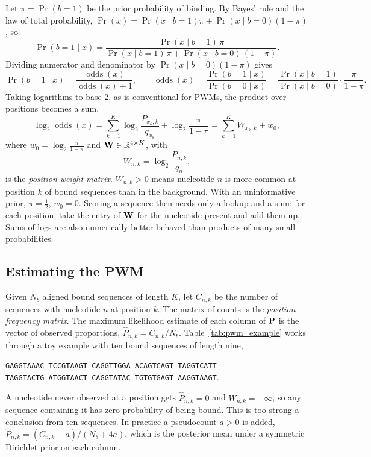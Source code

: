 Let $\pi=\Pr(b=1)$ be the prior probability of binding. By Bayes' rule and the law of total probability, $\Pr(x)=\Pr(x\mid b=1)\pi+\Pr(x\mid b=0)(1-\pi)$, so
\begin{equation}
  \Pr(b=1\mid x) = \frac{\Pr(x\mid b=1)\,\pi}{\Pr(x\mid b=1)\,\pi + \Pr(x\mid b=0)\,(1-\pi)} .
\end{equation}
Dividing numerator and denominator by $\Pr(x\mid b=0)(1-\pi)$ gives
\begin{equation}
  \Pr(b=1\mid x) = \frac{\operatorname{odds}(x)}{\operatorname{odds}(x)+1}, \qquad \operatorname{odds}(x) = \frac{\Pr(b=1\mid x)}{\Pr(b=0\mid x)} = \frac{\Pr(x\mid b=1)}{\Pr(x\mid b=0)}\cdot\frac{\pi}{1-\pi} .
  \label{eq:odds}
\end{equation}
Taking logarithms to base 2, as is conventional for PWMs, the product over positions becomes a sum,
\begin{equation}
  \log_2\operatorname{odds}(x) = \sum_{k=1}^K\log_2\frac{P_{x_k,k}}{q_{x_k}} + \log_2\frac{\pi}{1-\pi} = \sum_{k=1}^K W_{x_k,k} + w_0 ,
  \label{eq:logodds}
\end{equation}
where $w_0=\log_2\frac{\pi}{1-\pi}$ and $\mathbf{W}\in\mathbb{R}^{4\times K}$, with
\begin{equation}
  W_{n,k} = \log_2\frac{P_{n,k}}{q_n},
\end{equation}
is the \emph{position weight matrix}. $W_{n,k}>0$ means nucleotide $n$ is more common at position $k$ of bound sequences than in the background. With an uninformative prior, $\pi=\frac12$, $w_0=0$. Scoring a sequence then needs only a lookup and a sum: for each position, take the entry of $\mathbf{W}$ for the nucleotide present and add them up. Sums of logs are also numerically better behaved than products of many small probabilities.

\subsection{Estimating the PWM}

Given $N_b$ aligned bound sequences of length $K$, let $C_{n,k}$ be the number of sequences with nucleotide $n$ at position $k$. The matrix of counts is the \emph{position frequency matrix}. The maximum likelihood estimate of each column of $\mathbf{P}$ is the vector of observed proportions, $\hat P_{n,k}=C_{n,k}/N_b$. Table~\ref{tab:pwm_example} works through a toy example with ten bound sequences of length nine,
\begin{center}
\texttt{GAGGTAAAC\ TCCGTAAGT\ CAGGTTGGA\ ACAGTCAGT\ TAGGTCATT}\\
\texttt{TAGGTACTG\ ATGGTAACT\ CAGGTATAC\ TGTGTGAGT\ AAGGTAAGT}.
\end{center}
A nucleotide never observed at a position gets $\hat P_{n,k}=0$ and $W_{n,k}=-\infty$, so any sequence containing it has zero probability of being bound. This is too strong a conclusion from ten sequences. In practice a pseudocount $a>0$ is added, $\hat P_{n,k}=(C_{n,k}+a)/(N_b+4a)$, which is the posterior mean under a symmetric Dirichlet prior on each column.

